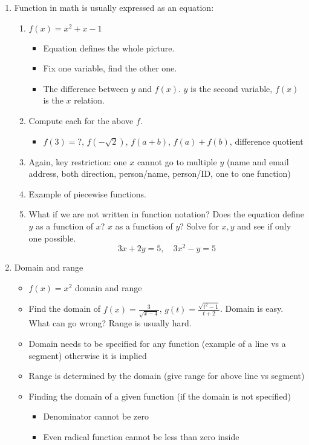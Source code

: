 \documentclass{article}
\begin{document}
\begin{enumerate}
\item Function in math is usually expressed as an equation: 
\begin{enumerate}
\item $f(x) = x^2+x-1$
\begin{itemize}
\item Equation defines the whole picture.
\item Fix one variable, find the other one.
\item The difference between $y$ and $f(x)$. $y$ is the second variable, $f(x)$ is the $x$ relation.
\end{itemize}
\item Compute each for the above $f$.
\begin{itemize}
\item $f(3)=?$, $f(-\sqrt{2})$, $f(a+b)$, $f(a)+f(b)$, difference quotient
\end{itemize}
\item Again, key restriction: one $x$ cannot go to multiple $y$ (name and email address, both direction, person/name, person/ID, one to one function)
\item Example of piecewise functions. 
\item What if we are not written in function notation? Does the equation define $y$ as a function of $x$? $x$ as a function of $y$? Solve for $x,y$ and see if only one possible.
\[
3x+2y=5, \quad 3x^2-y=5
\]
\end{enumerate}

\item Domain and range
\begin{itemize}
\item $f(x)=x^2$ domain and range
\item Find the domain of $\displaystyle f(x) = \frac{3}{\sqrt{x-4}}$, $\displaystyle g(t) = \frac{\sqrt{t^2-1}}{t+2}$. Domain is easy. What can go wrong? Range is usually hard. 
\item Domain needs to be specified for any function (example of a line vs a segment) otherwise it is implied
\item Range is determined by the domain (give range for above line vs segment)
\item Finding the domain of a given function (if the domain is not specified)
\begin{itemize}
\item Denominator cannot be zero
\item Even radical function cannot be less than zero inside
\end{itemize}
\end{itemize}
\end{enumerate}
\end{document}
